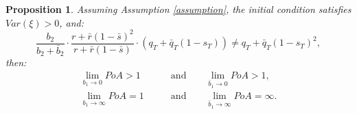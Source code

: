 \documentclass[11pt]{article}
\newtheorem{proposition}{Proposition}
\begin{document}
\begin{proposition}\label{prop:b1_b1bar}
	Assuming Assumption \ref{assumption}, the initial condition satisfies $Var(\xi)>0$, and:
	\begin{equation*}
	\frac{b_2}{b_2+\bar{b}_2}\cdot \frac{r + \bar{r}(1- \bar{s})^2}{r + \bar{r}(1-\bar{s})}\cdot (q_T+\bar{q}_T(1-s_T)) \neq q_T+\bar{q}_T(1-s_T)^2,
	\end{equation*}
	then:
	\begin{equation*}
	\begin{split}
	    \lim_{b_1 \to 0} PoA > 1\qquad &\text{and} \qquad \lim_{\bar{b}_1 \to 0} PoA > 1,\\
	    \lim_{b_1 \to \infty} PoA = 1 \qquad &\text{and} \qquad\lim_{\bar{b}_1 \to \infty} PoA =\infty.
	\end{split}
	\end{equation*}
\end{proposition}
\end{document}
